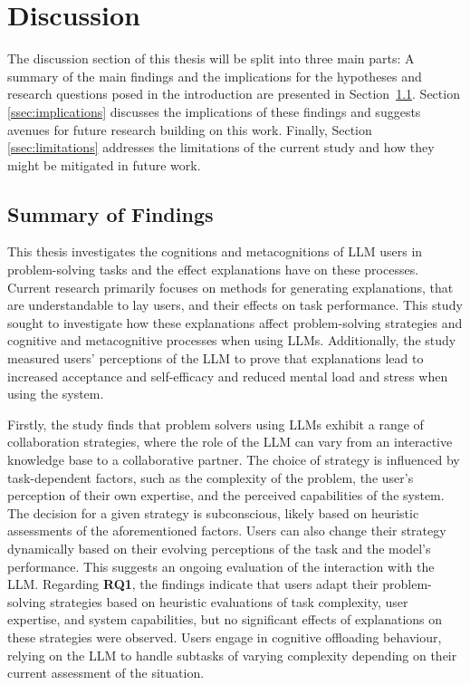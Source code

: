 \section{Discussion} \label{sec:discussion}

The discussion section of this thesis will be split into three main parts: A summary of the main findings and the implications for the hypotheses and research questions posed in the introduction are presented in Section~\ref{ssec:summary}. Section \ref{ssec:implications} discusses the implications of these findings and suggests avenues for future research building on this work. Finally, Section \ref{ssec:limitations} addresses the limitations of the current study and how they might be mitigated in future work.

\subsection{Summary of Findings} \label{ssec:summary}

This thesis investigates the cognitions and metacognitions of \ac{LLM} users in problem-solving tasks and the effect explanations have on these processes. Current research primarily focuses on methods for generating explanations, that are understandable to lay users, and their effects on task performance. This study sought to investigate how these explanations affect problem-solving strategies and cognitive and metacognitive processes when using \acp{LLM}. Additionally, the study measured users' perceptions of the \ac{LLM} to prove that explanations lead to increased acceptance and self-efficacy and reduced mental load and stress when using the system.

Firstly, the study finds that problem solvers using \acp{LLM} exhibit a range of collaboration strategies, where the role of the \ac{LLM} can vary from an interactive knowledge base to a collaborative partner. The choice of strategy is influenced by task-dependent factors, such as the complexity of the problem, the user's perception of their own expertise, and the perceived capabilities of the system. The decision for a given strategy is subconscious, likely based on heuristic assessments of the aforementioned factors. Users can also change their strategy dynamically based on their evolving perceptions of the task and the model's performance. This suggests an ongoing evaluation of the interaction with the \ac{LLM}. Regarding \textbf{RQ1}, the findings indicate that users adapt their problem-solving strategies based on heuristic evaluations of task complexity, user expertise, and system capabilities, but no significant effects of explanations on these strategies were observed. Users engage in cognitive offloading behaviour, relying on the \ac{LLM} to handle subtasks of varying complexity depending on their current assessment of the situation.

